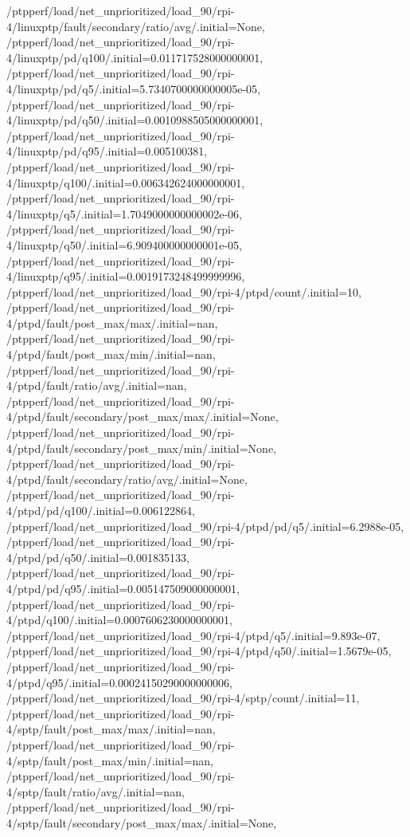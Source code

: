 {    /ptpperf/load/net_unprioritized/load_90/rpi-4/linuxptp/fault/secondary/ratio/avg/.initial=None,
    /ptpperf/load/net_unprioritized/load_90/rpi-4/linuxptp/pd/q100/.initial=0.011717528000000001,
    /ptpperf/load/net_unprioritized/load_90/rpi-4/linuxptp/pd/q5/.initial=5.7340700000000005e-05,
    /ptpperf/load/net_unprioritized/load_90/rpi-4/linuxptp/pd/q50/.initial=0.0010988505000000001,
    /ptpperf/load/net_unprioritized/load_90/rpi-4/linuxptp/pd/q95/.initial=0.005100381,
    /ptpperf/load/net_unprioritized/load_90/rpi-4/linuxptp/q100/.initial=0.006342624000000001,
    /ptpperf/load/net_unprioritized/load_90/rpi-4/linuxptp/q5/.initial=1.7049000000000002e-06,
    /ptpperf/load/net_unprioritized/load_90/rpi-4/linuxptp/q50/.initial=6.909400000000001e-05,
    /ptpperf/load/net_unprioritized/load_90/rpi-4/linuxptp/q95/.initial=0.0019173248499999996,
    /ptpperf/load/net_unprioritized/load_90/rpi-4/ptpd/count/.initial=10,
    /ptpperf/load/net_unprioritized/load_90/rpi-4/ptpd/fault/post_max/max/.initial=nan,
    /ptpperf/load/net_unprioritized/load_90/rpi-4/ptpd/fault/post_max/min/.initial=nan,
    /ptpperf/load/net_unprioritized/load_90/rpi-4/ptpd/fault/ratio/avg/.initial=nan,
    /ptpperf/load/net_unprioritized/load_90/rpi-4/ptpd/fault/secondary/post_max/max/.initial=None,
    /ptpperf/load/net_unprioritized/load_90/rpi-4/ptpd/fault/secondary/post_max/min/.initial=None,
    /ptpperf/load/net_unprioritized/load_90/rpi-4/ptpd/fault/secondary/ratio/avg/.initial=None,
    /ptpperf/load/net_unprioritized/load_90/rpi-4/ptpd/pd/q100/.initial=0.006122864,
    /ptpperf/load/net_unprioritized/load_90/rpi-4/ptpd/pd/q5/.initial=6.2988e-05,
    /ptpperf/load/net_unprioritized/load_90/rpi-4/ptpd/pd/q50/.initial=0.001835133,
    /ptpperf/load/net_unprioritized/load_90/rpi-4/ptpd/pd/q95/.initial=0.005147509000000001,
    /ptpperf/load/net_unprioritized/load_90/rpi-4/ptpd/q100/.initial=0.0007606230000000001,
    /ptpperf/load/net_unprioritized/load_90/rpi-4/ptpd/q5/.initial=9.893e-07,
    /ptpperf/load/net_unprioritized/load_90/rpi-4/ptpd/q50/.initial=1.5679e-05,
    /ptpperf/load/net_unprioritized/load_90/rpi-4/ptpd/q95/.initial=0.00024150290000000006,
    /ptpperf/load/net_unprioritized/load_90/rpi-4/sptp/count/.initial=11,
    /ptpperf/load/net_unprioritized/load_90/rpi-4/sptp/fault/post_max/max/.initial=nan,
    /ptpperf/load/net_unprioritized/load_90/rpi-4/sptp/fault/post_max/min/.initial=nan,
    /ptpperf/load/net_unprioritized/load_90/rpi-4/sptp/fault/ratio/avg/.initial=nan,
    /ptpperf/load/net_unprioritized/load_90/rpi-4/sptp/fault/secondary/post_max/max/.initial=None,
}
